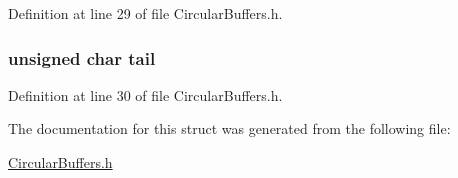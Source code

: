 Definition at line 29 of file Circular\+Buffers.\+h.

\hypertarget{structcircular_buffer_af18a1d7542e277284c4794593b049258}{
\subsubsection[{tail}]{\setlength{\rightskip}{0pt plus 5cm}unsigned char tail}}\label{structcircular_buffer_af18a1d7542e277284c4794593b049258}


Definition at line 30 of file Circular\+Buffers.\+h.



The documentation for this struct was generated from the following file\+:\begin{DoxyCompactItemize}
\item 
\hyperlink{_circular_buffers_8h}{Circular\+Buffers.\+h}\end{DoxyCompactItemize}
